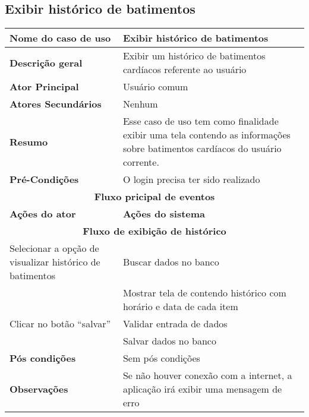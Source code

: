 \subsection{Exibir histórico de batimentos}
\begin{center}
\begin{tabular}{ |p{7cm}|p{7cm}| } 
 \hline
 \textbf {Nome do caso de uso} & Exibir histórico de batimentos\\
 \hline
 \textbf{Descrição geral} & Exibir um histórico de batimentos cardíacos referente ao usuário \\
 \hline
 \textbf{Ator Principal} & Usuário comum \\ 
 \hline
 \textbf{Atores Secundários} & Nenhum \\
 \hline
 \textbf{Resumo} & Esse caso de uso tem como finalidade exibir uma tela contendo as informações sobre batimentos cardíacos do usuário corrente. \\
 \hline
 \textbf{Pré-Condições} & O login precisa ter sido realizado \\
 \hline 
 \multicolumn{2}{|c|}{\textbf{Fluxo pricipal de eventos} } \\
 \hline
 \textbf{Ações do ator} & \textbf{Ações do sistema} \\
 \hline
 \multicolumn{2}{|c|}{\textbf{Fluxo de exibição de histórico} } \\
 \hline 
 Selecionar a opção de visualizar histórico de batimentos & Buscar dados no banco \\
 \hline
  & Mostrar tela de contendo histórico com horário e data de cada item\\
 \hline
 Clicar no botão “salvar” & Validar entrada de dados \\
 \hline
  & Salvar dados no banco \\
 \hline
 \textbf{Pós condições} & Sem pós condições \\
 \hline
 \textbf{Observações} & Se não houver conexão com a internet, a aplicação irá exibir uma mensagem de erro\\
 \hline
\end{tabular}
\end{center}